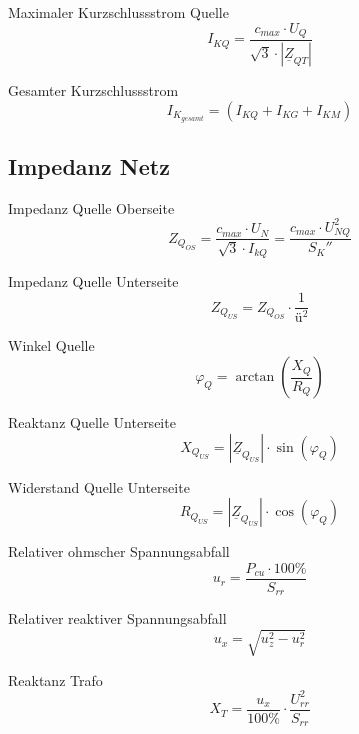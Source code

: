 \documentclass[11pt, a4paper, final, fleqn, twocolumn]{article}
\numberwithin{equation}{subsection}
\begin{document}
\noindent Maximaler Kurzschlussstrom Quelle
\begin{equation}
    I_{KQ} = \frac{c_{max} \cdot U_Q}{\sqrt{3} \cdot |\underline{Z}_{QT}|}
\end{equation}

\noindent Gesamter Kurzschlussstrom
\begin{equation}
    I_{K_{gesamt}} = (I_{KQ} + I_{KG} + I_{KM})
\end{equation}


\subsection{Impedanz Netz}

Impedanz Quelle Oberseite
\begin{equation}
    Z_{Q_{OS}} = \frac{c_{max} \cdot U_N}{\sqrt{3} \cdot I_{kQ}} = \frac{c_{max} \cdot U_{NQ}^2}{S_K''}
\end{equation}

\noindent Impedanz Quelle Unterseite
\begin{equation}
    Z_{Q_{US}} = Z_{Q_{OS}} \cdot \frac{1}{\text{ü}^2}
\end{equation}

\noindent Winkel Quelle
\begin{equation}
    \varphi_Q = \arctan(\frac{X_Q}{R_Q})
\end{equation}

\noindent Reaktanz Quelle Unterseite
\begin{equation}
    X_{Q_{US}} = |\underline{Z}_{Q_{US}}| \cdot \sin(\varphi_Q)
\end{equation}

\noindent Widerstand Quelle Unterseite
\begin{equation}
    R_{Q_{US}} = |\underline{Z}_{Q_{US}}| \cdot \cos(\varphi_Q)
\end{equation}

\noindent Relativer ohmscher Spannungsabfall
\begin{equation}
    u_r = \frac{P_{cu} \cdot 100\%}{S_{rr}}
\end{equation}

\noindent Relativer reaktiver Spannungsabfall
\begin{equation}
    u_x = \sqrt{u_z^2 - u_r^2}
\end{equation}

\noindent Reaktanz Trafo
\begin{equation}
    X_T = \frac{u_x}{100\%} \cdot \frac{U_{rr}^2}{S_{rr}}
\end{equation}
\end{document}
